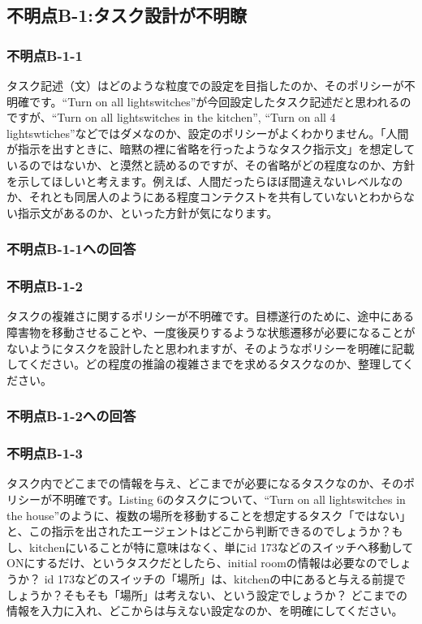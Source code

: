 \documentclass{jsarticle}
\begin{document}
\subsection*{不明点B-1:タスク設計が不明瞭}
\subsubsection*{不明点B-1-1}
\begin{screen}
タスク記述（文）はどのような粒度での設定を目指したのか、そのポリシーが不明確です。``Turn on all lightswitches''が今回設定したタスク記述だと思われるのですが、``Turn on all lightswitches in the kitchen'', ``Turn on all 4 lightswtiches''などではダメなのか、設定のポリシーがよくわかりません。「人間が指示を出すときに、暗黙の裡に省略を行ったようなタスク指示文」を想定しているのではないか、と漠然と読めるのですが、その省略がどの程度なのか、方針を示してほしいと考えます。例えば、人間だったらほぼ間違えないレベルなのか、それとも同居人のようにある程度コンテクストを共有していないとわからない指示文があるのか、といった方針が気になります。
\end{screen}

\subsubsection*{不明点B-1-1への回答}

\subsubsection*{不明点B-1-2}
\begin{screen}
タスクの複雑さに関するポリシーが不明確です。目標遂行のために、途中にある障害物を移動させることや、一度後戻りするような状態遷移が必要になることがないようにタスクを設計したと思われますが、そのようなポリシーを明確に記載してください。どの程度の推論の複雑さまでを求めるタスクなのか、整理してください。
\end{screen}

\subsubsection*{不明点B-1-2への回答}


\subsubsection*{不明点B-1-3}
\begin{screen}
タスク内でどこまでの情報を与え、どこまでが必要になるタスクなのか、そのポリシーが不明確です。Listing 6のタスクについて、``Turn on all lightswitches in the house''のように、複数の場所を移動することを想定するタスク「ではない」と、この指示を出されたエージェントはどこから判断できるのでしょうか？もし、kitchenにいることが特に意味はなく、単にid 173などのスイッチへ移動してONにするだけ、というタスクだとしたら、initial roomの情報は必要なのでしょうか？ id 173などのスイッチの「場所」は、kitchenの中にあると与える前提でしょうか？そもそも「場所」は考えない、という設定でしょうか？ どこまでの情報を入力に入れ、どこからは与えない設定なのか、を明確にしてください。
\end{screen}
\end{document}
